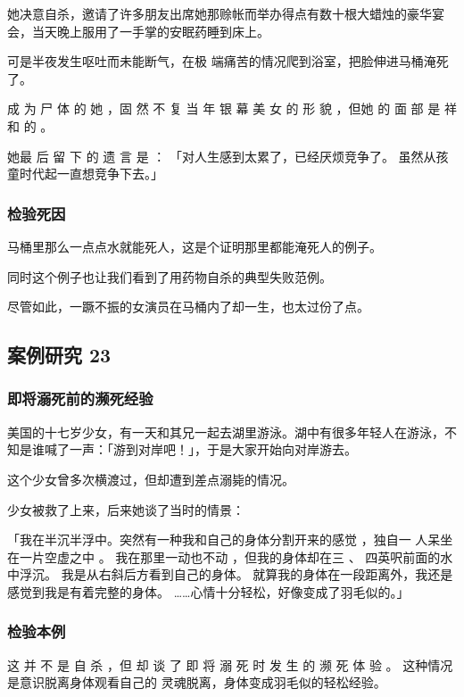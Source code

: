 \documentclass[UTF8]{ctexart}
\begin{document}
她决意自杀，邀请了许多朋友出席她那赊帐而举办得点有数十根大蜡烛的豪华宴会，当天晚上服用了一手掌的安眠药睡到床上。

可是半夜发生呕吐而未能断气，在极 端痛苦的情况爬到浴室，把脸伸进马桶淹死了。

成 为 尸 体 的 她 ，固 然 不 复 当 年 银 幕 美 女 的 形 貌 ，但她 的 面 部 是 祥 和 的 。

她最 后 留 下 的 遗 言 是 ： 「对人生感到太累了，已经厌烦竞争了。
虽然从孩童时代起一直想竞争下去。」


\subsubsection*{检验死因}

马桶里那么一点点水就能死人，这是个证明那里都能淹死人的例子。

同时这个例子也让我们看到了用药物自杀的典型失败范例。 

尽管如此，一蹶不振的女演员在马桶内了却一生，也太过份了点。


\subsection{案例研究 23}

\subsubsection*{即将溺死前的濒死经验}

美国的十七岁少女，有一天和其兄一起去湖里游泳。湖中有很多年轻人在游泳，不知是谁喊了一声：「游到对岸吧！」，于是大家开始向对岸游去。

这个少女曾多次横渡过，但却遭到差点溺毙的情况。

少女被救了上来，后来她谈了当时的情景：

「我在半沉半浮中。突然有一种我和自己的身体分割开来的感觉 ，独自一 人呆坐在一片空虚之中 。
我在那里一动也不动 ，但我的身体却在三 、 四英呎前面的水中浮沉。
我是从右斜后方看到自己的身体。
就算我的身体在一段距离外，我还是感觉到我是有着完整的身体。
……心情十分轻松，好像变成了羽毛似的。」

\subsubsection*{检验本例}

这 并 不 是 自 杀 ，但 却 谈 了 即 将 溺 死 时 发 生 的 濒 死 体 验 。
这种情况是意识脱离身体观看自己的 灵魂脱离，身体变成羽毛似的轻松经验。
\end{document}
